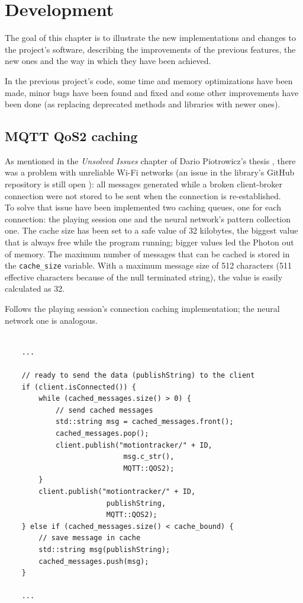 \chapter{Development}
The goal of this chapter is to illustrate the new implementations and changes to the project's software, describing the improvements of the previous features, the new ones and the way in which they have been achieved.
\bigbreak

In the previous project's code, some time and memory optimizations have been made, minor bugs have been found and fixed and some other improvements have been done (as replacing deprecated methods and libraries with newer ones).

\section{MQTT QoS2 caching}
As mentioned in the \textit{Unsolved Issues} chapter of Dario Piotrowicz's thesis \cite{Pio19}, there was a problem with unreliable Wi-Fi networks (an issue in the library's GitHub repository is still open \cite{githubQos2Issue}): all messages generated while a broken client-broker connection were not stored to be sent when the connection is re-established.\\
To solve that issue have been implemented two caching queues, one for each connection: the playing session one and the neural network's pattern collection one. The cache size has been set to a safe value of 32 kilobytes, the biggest value that is always free while the program running; bigger values led the Photon out of memory.
The maximum number of messages that can be cached is stored in the \texttt{cache\_size} variable. With a maximum message size of 512 characters (511 effective characters because of the null terminated string), the value is easily calculated as 32.

Follows the playing session's connection caching implementation; the neural network one is analogous.
\bigbreak

\begin{lstlisting}[style=CPPStyle]

	...

	// ready to send the data (publishString) to the client
	if (client.isConnected()) {
        while (cached_messages.size() > 0) {
			// send cached messages
            std::string msg = cached_messages.front();
            cached_messages.pop();
			client.publish("motiontracker/" + ID,
							msg.c_str(),
							MQTT::QOS2);
        }
		client.publish("motiontracker/" + ID,
						publishString,
						MQTT::QOS2);
    } else if (cached_messages.size() < cache_bound) {
		// save message in cache
        std::string msg(publishString);
        cached_messages.push(msg);
    }

	...

\end{lstlisting}
\bigbreak

